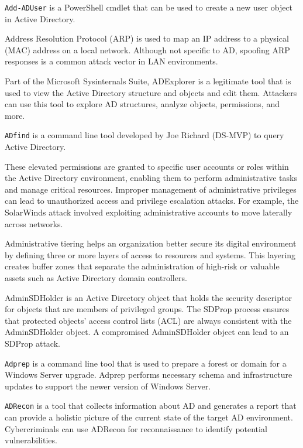  \texttt{Add-ADUser} is a PowerShell cmdlet that can be used to create a new user object in Active Directory.

 Address Resolution Protocol (ARP) is used to map an IP address to a physical (MAC) address on a local network. Although not specific to AD, spoofing ARP responses is a common attack vector in LAN environments.

 Part of the Microsoft Sysinternals Suite, ADExplorer is a legitimate tool that is used to view the Active Directory structure and objects and edit them. Attackers can use this tool to explore AD structures, analyze objects, permissions, and more.

 \texttt{ADfind} is a command line tool developed by Joe Richard (DS-MVP) to query Active Directory.

 These elevated permissions are granted to specific user accounts or roles within the Active Directory environment, enabling them to perform administrative tasks and manage critical resources. Improper management of administrative privileges can lead to unauthorized access and privilege escalation attacks. For example, the SolarWinds attack involved exploiting administrative accounts to move laterally across networks.

Administrative tiering helps an organization better secure its digital environment by defining three or more layers of access to resources and systems. This layering creates buffer zones that separate the administration of high-risk or valuable assets such as Active Directory domain controllers.

 AdminSDHolder is an Active Directory object that holds the security descriptor for objects that are members of privileged groups. The SDProp process ensures that protected objects’ access control lists (ACL) are always consistent with the AdminSDHolder object. A compromised AdminSDHolder object can lead to an SDProp attack.

 \texttt{Adprep} is a command line tool that is used to prepare a forest or domain for a Windows Server upgrade. Adprep performs necessary schema and infrastructure updates to support the newer version of Windows Server.

 \texttt{ADRecon} is a tool that collects information about AD and generates a report that can provide a holistic picture of the current state of the target AD environment. Cybercriminals can use ADRecon for reconnaissance to identify potential vulnerabilities.

